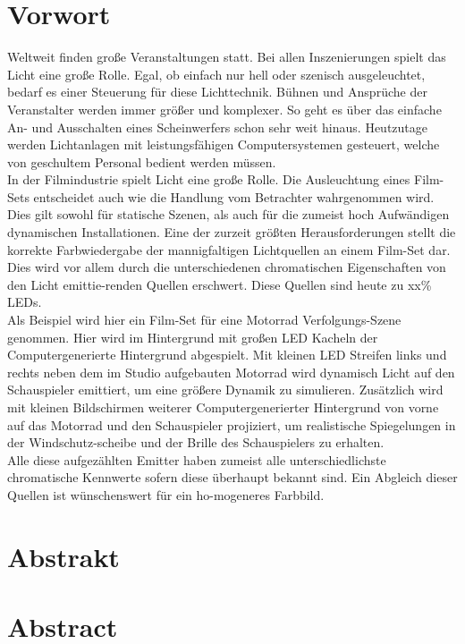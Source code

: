 \documentclass{scrartcl}
\begin{document}
\section{Vorwort}
Weltweit finden große Veranstaltungen statt. Bei allen Inszenierungen spielt das Licht eine große Rolle. Egal, ob einfach nur hell oder szenisch ausgeleuchtet, bedarf es einer Steuerung für diese Lichttechnik. Bühnen und Ansprüche der Veranstalter werden immer größer und komplexer. So geht es über das einfache An- und Ausschalten eines Scheinwerfers schon sehr weit hinaus. Heutzutage werden Lichtanlagen mit leistungsfähigen Computersystemen gesteuert, welche von geschultem Personal bedient werden müssen.\\
In der Filmindustrie spielt Licht eine große Rolle. Die Ausleuchtung eines Film-Sets entscheidet auch wie die Handlung vom Betrachter wahrgenommen wird. Dies gilt sowohl für statische Szenen, als auch für die zumeist hoch Aufwändigen dynamischen Installationen.
Eine der zurzeit größten Herausforderungen stellt die korrekte Farbwiedergabe der mannigfaltigen Lichtquellen an einem Film-Set dar.
Dies wird vor allem durch die unterschiedenen chromatischen Eigenschaften von den Licht emittie-renden Quellen erschwert. Diese Quellen sind heute zu xx\% LEDs.\\
Als Beispiel wird hier ein Film-Set für eine Motorrad Verfolgungs-Szene genommen. Hier wird im Hintergrund mit großen LED Kacheln der Computergenerierte Hintergrund abgespielt. Mit kleinen LED Streifen links und rechts neben dem im Studio aufgebauten Motorrad wird dynamisch Licht auf den Schauspieler emittiert, um eine größere Dynamik zu simulieren.
Zusätzlich wird mit kleinen Bildschirmen weiterer Computergenerierter Hintergrund von vorne auf das Motorrad und den Schauspieler projiziert, um realistische Spiegelungen in der Windschutz-scheibe und der Brille des Schauspielers zu erhalten.\\
Alle diese aufgezählten Emitter haben zumeist alle unterschiedlichste chromatische Kennwerte sofern diese überhaupt bekannt sind. Ein Abgleich dieser Quellen ist wünschenswert für ein ho-mogeneres Farbbild. 
\clearpage

\section{Abstrakt}
\section{Abstract}
\clearpage
\end{document}
